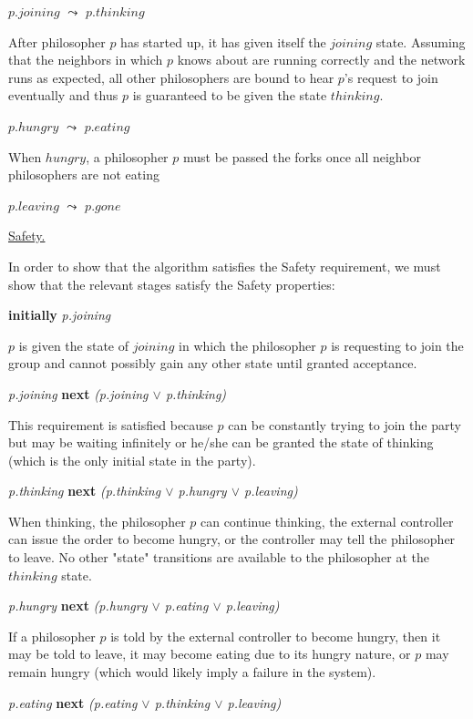 \documentclass[11pt]{article}
\begin{document}
$p.joining$ $\leadsto$ $p.thinking$

\indent After philosopher $p$ has started up, it has given itself the $joining$ state. Assuming that the neighbors in which $p$ knows about are running correctly and the network runs as expected, all other philosophers are bound to hear $p$'s request to join eventually and thus $p$ is guaranteed to be given the state $thinking$.

$p.hungry$ $\leadsto$ $p.eating$

\indent When $hungry$, a philosopher $p$ must be passed the forks once all neighbor philosophers are not eating

$p.leaving$ $\leadsto$ $p.gone$

\indent


\underline{\large{Safety.}}

In order to show that the algorithm satisfies the Safety requirement, we must show that the relevant stages satisfy the Safety properties:

{\bfseries initially} {\it p.joining}

\indent $p$ is given the state of $joining$ in which the philosopher $p$ is requesting to join the group and cannot possibly gain any other state until granted acceptance.

{\it p.joining} {\bfseries next} {\it (p.joining $\vee$ p.thinking)}

\indent This requirement is satisfied because $p$ can be constantly trying to join the party but may be waiting infinitely or he/she can be granted the state of thinking (which is the only initial state in the party).

{\it p.thinking} {\bfseries next} {\it (p.thinking $\vee$ p.hungry $\vee$ p.leaving)}

\indent When thinking, the philosopher $p$ can continue thinking, the external controller can issue the order to become hungry, or the controller may tell the philosopher to leave. No other "state" transitions are available to the philosopher at the $thinking$ state. 

{\it p.hungry} {\bfseries next} {\it (p.hungry $\vee$ p.eating $\vee$ p.leaving)}

\indent If a philosopher $p$ is told by the external controller to become hungry, then it may be told to leave, it may become eating due to its hungry nature, or $p$ may remain hungry (which would likely imply a failure in the system).

{\it p.eating} {\bfseries next} {\it (p.eating $\vee$ p.thinking $\vee$ p.leaving)}
\end{document}
